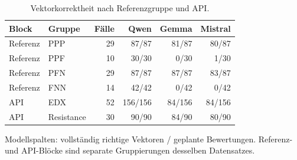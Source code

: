 \begin{table}[htbp]
\centering\small
\caption{Vektorkorrektheit nach Referenzgruppe und API.}
\label{tab_v2_subgroups}
\begin{tabular}{llrrrr}
\toprule
Block & Gruppe & Fälle & Qwen & Gemma & Mistral \\
\midrule
Referenz & PPP & 29 & 87/87 & 81/87 & 80/87 \\
Referenz & PPF & 10 & 30/30 & 0/30 & 1/30 \\
Referenz & PFN & 29 & 87/87 & 87/87 & 83/87 \\
Referenz & FNN & 14 & 42/42 & 0/42 & 0/42 \\
\midrule
API & EDX & 52 & 156/156 & 84/156 & 84/156 \\
API & Resistance & 30 & 90/90 & 84/90 & 80/90 \\
\bottomrule
\end{tabular}
\par\smallskip\noindent
\begin{minipage}{\linewidth}\footnotesize Modellspalten: vollständig richtige Vektoren / geplante Bewertungen. Referenz- und API-Blöcke sind separate Gruppierungen desselben Datensatzes.\end{minipage}
\end{table}
